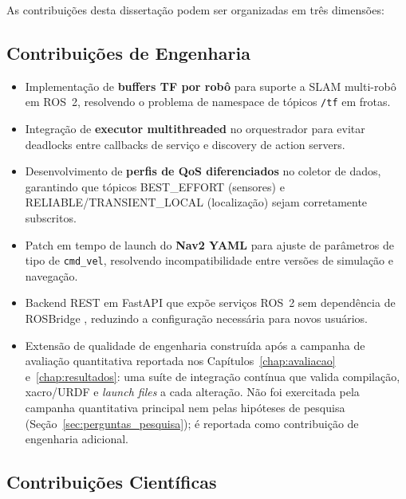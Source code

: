 As contribuições desta dissertação podem ser organizadas em três dimensões:

\subsection{Contribuições de Engenharia}

\begin{itemize}
    \item Implementação de \textbf{buffers TF por robô} para suporte a SLAM multi-robô
    em ROS~2, resolvendo o problema de namespace de tópicos \texttt{/\allowbreak tf} em frotas.

    \item Integração de \textbf{executor multithreaded} no orquestrador para evitar
    deadlocks entre callbacks de serviço e discovery de action servers.

    \item Desenvolvimento de \textbf{perfis de QoS diferenciados} no coletor de dados,
    garantindo que tópicos BEST\_EFFORT (sensores) e RELIABLE/TRANSIENT\_LOCAL
    (localização) sejam corretamente subscritos.

    \item Patch em tempo de launch do \textbf{Nav2 YAML} para ajuste de parâmetros
    de tipo de \texttt{cmd\_\allowbreak vel}, resolvendo incompatibilidade entre versões de
    simulação e navegação.

    \item Backend REST em FastAPI que expõe serviços ROS~2 sem dependência de
    ROSBridge \cite{toris2015}, reduzindo a configuração necessária para novos usuários.

    \item Extensão de qualidade de engenharia construída após a
    campanha de avaliação quantitativa reportada nos Capítulos~\ref{chap:avaliacao}
    e~\ref{chap:resultados}: uma suíte de integração contínua que valida
    compilação, xacro/URDF e \textit{launch files} a cada alteração. Não foi
    exercitada pela campanha quantitativa principal nem pelas hipóteses de
    pesquisa (Seção~\ref{sec:perguntas_pesquisa}); é reportada como
    contribuição de engenharia adicional.
\end{itemize}

\subsection{Contribuições Científicas}

